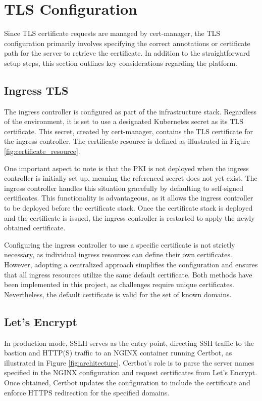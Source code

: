\section{TLS Configuration} 
Since TLS certificate requests are managed by cert-manager, the TLS configuration primarily involves specifying the correct annotations or certificate path for the server to retrieve the certificate. In addition to the straightforward setup steps, this section outlines key considerations regarding the platform.

\subsection{Ingress TLS} 
The ingress controller is configured as part of the infrastructure stack. Regardless of the environment, it is set to use a designated Kubernetes secret as its TLS certificate. This secret, created by cert-manager, contains the TLS certificate for the ingress controller. The certificate resource is defined as illustrated in Figure \ref{fig:certificate_resource}.

One important aspect to note is that the PKI is not deployed when the ingress controller is initially set up, meaning the referenced secret does not yet exist. The ingress controller handles this situation gracefully by defaulting to self-signed certificates. This functionality is advantageous, as it allows the ingress controller to be deployed before the certificate stack. Once the certificate stack is deployed and the certificate is issued, the ingress controller is restarted to apply the newly obtained certificate.

Configuring the ingress controller to use a specific certificate is not strictly necessary, as individual ingress resources can define their own certificates. However, adopting a centralized approach simplifies the configuration and ensures that all ingress resources utilize the same default certificate. Both methods have been implemented in this project, as challenges require unique certificates. Nevertheless, the default certificate is valid for the set of known domains.

\subsection{Let's Encrypt}\label{sec:letsencrypt} 
In production mode, SSLH serves as the entry point, directing SSH traffic to the bastion and HTTP(S) traffic to an NGINX container running Certbot, as illustrated in Figure \ref{fig:architecture}. Certbot's role is to parse the server names specified in the NGINX configuration and request certificates from Let's Encrypt. Once obtained, Certbot updates the configuration to include the certificate and enforce HTTPS redirection for the specified domains.

